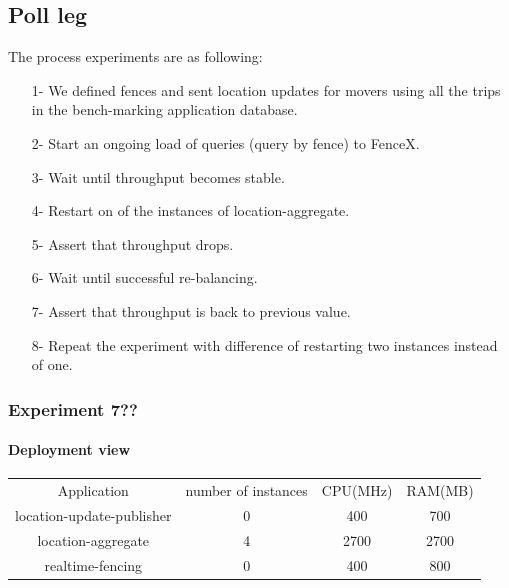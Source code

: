 \documentclass[a4]{report}
\begin{document}
    \subsection{Poll leg}
    The process experiments are as following:
    \begin{itemize}
        \item[1-] We defined fences and sent location updates for movers using all the trips in the bench-marking
        application database.
        \item[2-] Start an ongoing load of queries (query by fence) to FenceX.
        \item[3-] Wait until throughput becomes stable.
        \item[4-] Restart on of the instances of location-aggregate.
        \item[5-] Assert that throughput drops.
        \item[6-] Wait until successful re-balancing.
        \item[7-] Assert that throughput is back to previous value.
        \item[8-] Repeat the experiment with difference of restarting two instances instead of one.
    \end{itemize}

    \subsubsection{Experiment 7??}

    \paragraph{Deployment view}
    \begin{center}
        \begin{tabular}{ c c c c }
            Application               & number of instances & CPU(MHz) & RAM(MB) \\
            location-update-publisher & 0                   & 400      & 700     \\
            location-aggregate        & 4                   & 2700     & 2700    \\
            realtime-fencing          & 0                   & 400      & 800     \\
        \end{tabular}
    \end{center}
\end{document}
